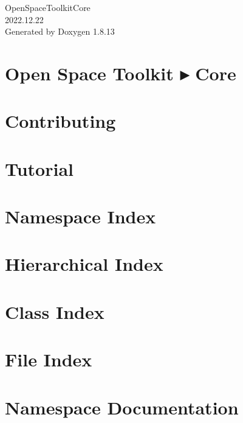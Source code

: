\documentclass[twoside]{book}
\newcommand{\+}{\discretionary{\mbox{\scriptsize$\hookleftarrow$}}{}{}}
\newcommand{\clearemptydoublepage}{%
  \newpage{\pagestyle{empty}\cleardoublepage}%
}
\begin{document}
\hypersetup{pageanchor=false,
             bookmarksnumbered=true,
             pdfencoding=unicode
            }
\begin{titlepage}
\vspace*{7cm}
\begin{center}%
{\Large Open\+Space\+Toolkit\+Core \\[1ex]\large 2022.\+12.\+22 }\\
\vspace*{1cm}
{\large Generated by Doxygen 1.8.13}\\
\end{center}
\end{titlepage}
\clearemptydoublepage
{}
\tableofcontents
\clearemptydoublepage
{}
\hypersetup{pageanchor=true}

\chapter{Open Space Toolkit ▸ Core}
\label{index}\hypertarget{index}{}
\chapter{Contributing}
\label{md__c_o_n_t_r_i_b_u_t_i_n_g}

\chapter{Tutorial}
\label{md_docs__tutorial}

\chapter{Namespace Index}

\chapter{Hierarchical Index}

\chapter{Class Index}

\chapter{File Index}

\chapter{Namespace Documentation}














\end{document}
